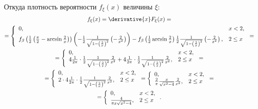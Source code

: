 \documentclass[12pt,a4paper]{article}
\begin{document}
    Откуда плотность вероятности $f_\xi(x)$ величины $\xi$:
    \begin{multline}
        f_\xi(x)
        = \derivative{x} F_\xi(x) = \\
        = \left \{
        \begin{array}{ll}
            0,                                                                                                                                                                                                                                                                                                                                                                           & x < 2 , \\
            f_\beta \left ( \frac{1}{2} \left ( \frac{\pi}{2} - \arcsin \frac{2}{x} \right ) \right ) \left ( - \frac{1}{2} \frac{1}{\sqrt{ 1 - \left ( \frac{2}{x} \right )^2}} \left ( - \frac{2}{x^2} \right ) \right ) - f_\beta \left ( \frac{1}{2} \arcsin \frac{2}{x} \right ) \frac{1}{2} \frac{1}{\sqrt{ 1 - \left ( \frac{2}{x} \right )^2}} \left ( - \frac{2}{x^2} \right ), & 2 \le x
        \end{array}
        \right . = \\
        = \left \{
        \begin{array}{ll}
            0,                                                                                                                                                                                                               & x < 2 , \\
            4 \frac{1}{2 \pi} \cdot \frac{1}{2} \frac{1}{\sqrt{ 1 - \left ( \frac{2}{x} \right )^2}} \frac{2}{x^2} + 4 \frac{1}{2 \pi} \cdot \frac{1}{2} \frac{1}{\sqrt{ 1 - \left ( \frac{2}{x} \right )^2}} \frac{2}{x^2}, & 2 \le x
        \end{array}
        \right . = \\
        = \left \{
        \begin{array}{ll}
            0,                                                                                                              & x < 2 , \\
            2 \cdot 4 \frac{1}{2 \pi} \cdot \frac{1}{2} \frac{1}{\sqrt{ 1 - \left ( \frac{2}{x} \right )^2}} \frac{2}{x^2}, & 2 \le x
        \end{array}
        \right .
        = \left \{
        \begin{array}{ll}
            0,                                                    & x < 2 , \\
            \frac{2}{\pi} \frac{x}{\sqrt{x^2 - 4}} \frac{2}{x^2}, & 2 \le x
        \end{array}
        \right . = \\
        = \left \{
        \begin{array}{ll}
            0,                              & x < 2 , \\
            \frac{4}{\pi x \sqrt{x^2 - 4}}, & 2 \le x
        \end{array}
        \right .
        .
    \end{multline}
\end{document}
